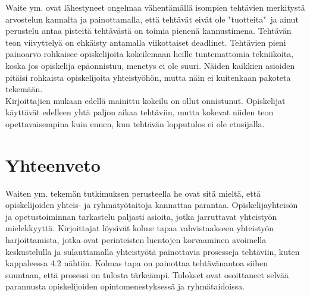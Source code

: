 \documentclass[finnish]{../tktltiki2}
\theoremstyle{definition}
\theoremstyle{remark}
\begin{document}
\begin{itemize}
Waite ym. ovat lähestyneet ongelmaa vähentämällä isompien tehtävien merkitystä arvostelun kannalta ja painottamalla, että tehtävät eivät ole "tuotteita"~ja ainut perustelu antaa pisteitä tehtävästä on toimia pienenä kannustimena. Tehtävän teon viivyttelyä on ehkäisty antamalla viikottaiset deadlinet. Tehtävien pieni painoarvo rohkaisee opiskelijoita kokeilemaan heille tuntemattomia tekniikoita, koska jos opiskelija epäonnistuu, menetys ei ole suuri. Näiden kaikkien asioiden pitäisi rohkaista opiskelijoita yhteistyöhön, mutta näin ei kuitenkaan pakoteta tekemään.\\

Kirjoittajien mukaan edellä mainittu kokeilu on ollut onnistunut. Opiskelijat käyttävät edelleen yhtä paljon aikaa tehtäviin, mutta kokevat niiden teon opettavaisempina kuin ennen, kun tehtävän lopputulos ei ole etusijalla.

\end{itemize}

\section{Yhteenveto}

Waiten ym. tekemän tutkimuksen perusteella he ovat sitä mieltä, että opiskelijoiden yhteis- ja ryhmätyötaitoja kannattaa parantaa. Opiskelijayhteisön ja opetustoiminnan tarkastelu paljasti asioita, jotka jarruttavat yhteistyön mielekkyyttä. Kirjoittajat löysivät kolme tapaa vahvistaakseen yhteistyön harjoittamista, jotka ovat perinteisten luentojen korvaaminen avoimella keskustelulla ja sulauttamalla yhteistyötä painottavia prosesseja tehtäviin, kuten kappaleessa 4.2 nähtiin. Kolmas tapa on painottaa tehtävänantoa siihen suuntaan, että prosessi on tulosta tärkeämpi. Tulokset ovat osoittaneet selvää parannusta opiskelijoiden opintomenestyksessä ja ryhmätaidoissa.

%
%
% 
%



\end{document}
